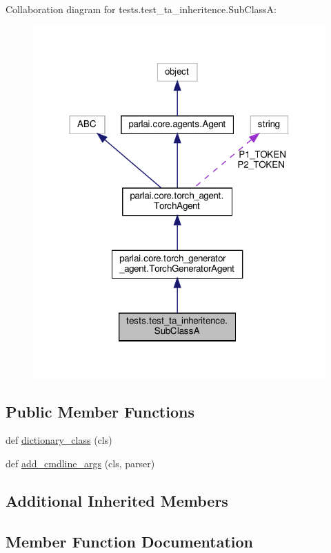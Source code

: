 Collaboration diagram for tests.\+test\+\_\+ta\+\_\+inheritence.\+Sub\+ClassA\+:
\nopagebreak
\begin{figure}[H]
\begin{center}
\leavevmode
\includegraphics[width=318pt]{classtests_1_1test__ta__inheritence_1_1SubClassA__coll__graph}
\end{center}
\end{figure}
\subsection*{Public Member Functions}
\begin{DoxyCompactItemize}
\item 
def \hyperlink{classtests_1_1test__ta__inheritence_1_1SubClassA_aa01b5f43121b539c377b9b1d50f93d0c}{dictionary\+\_\+class} (cls)
\item 
def \hyperlink{classtests_1_1test__ta__inheritence_1_1SubClassA_a088369e91c8005b70d20f17032998215}{add\+\_\+cmdline\+\_\+args} (cls, parser)
\end{DoxyCompactItemize}
\subsection*{Additional Inherited Members}


\subsection{Member Function Documentation}
\mbox{\label{classtests_1_1test__ta__inheritence_1_1SubClassA_a088369e91c8005b70d20f17032998215}} 
